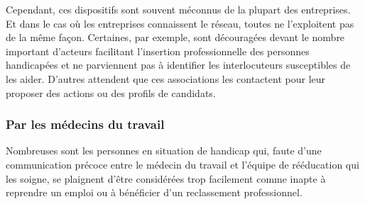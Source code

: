 Cependant, ces dispositifs sont souvent méconnus de la plupart des entreprises. 
Et dans le cas où les entreprises connaissent le réseau, toutes ne l'exploitent pas de la même façon. Certaines, par exemple, sont découragées devant le nombre important d'acteurs facilitant l'insertion professionnelle des personnes handicapées et ne parviennent pas à identifier les interlocuteurs susceptibles de les aider. D'autres attendent que ces associations les contactent pour leur proposer des actions ou des profils de candidats.

\subsubsection{Par les médecins du travail}
Nombreuses sont les personnes en situation de handicap qui, faute d'une communication précoce entre le médecin du travail et l'équipe de rééducation qui les soigne, se plaignent d'être considérées trop facilement comme inapte à reprendre un emploi ou à bénéficier d'un reclassement professionnel.


